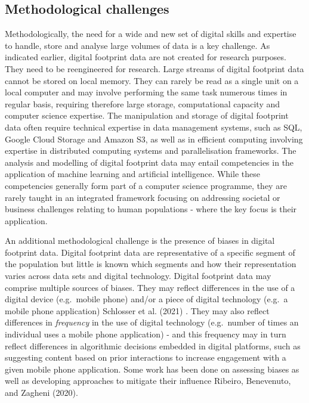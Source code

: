 \documentclass[
  letterpaper,
  DIV=11,
  numbers=noendperiod]{scrreprt}
\begin{document}
\hypertarget{methodological-challenges}{%
\subsection{Methodological challenges}\label{methodological-challenges}}

Methodologically, the need for a wide and new set of digital skills and
expertise to handle, store and analyse large volumes of data is a key
challenge. As indicated earlier, digital footprint data are not created
for research purposes. They need to be reengineered for research. Large
streams of digital footprint data cannot be stored on local memory. They
can rarely be read as a single unit on a local computer and may involve
performing the same task numerous times in regular basis, requiring
therefore large storage, computational capacity and computer science
expertise. The manipulation and storage of digital footprint data often
require technical expertise in data management systems, such as SQL,
Google Cloud Storage and Amazon S3, as well as in efficient computing
involving expertise in distributed computing systems and parallelisation
frameworks. The analysis and modelling of digital footprint data may
entail competencies in the application of machine learning and
artificial intelligence. While these competencies generally form part of
a computer science programme, they are rarely taught in an integrated
framework focusing on addressing societal or business challenges
relating to human populations - where the key focus is their
application.

An additional methodological challenge is the presence of biases in
digital footprint data. Digital footprint data are representative of a
specific segment of the population but little is known which segments
and how their representation varies across data sets and digital
technology. Digital footprint data may comprise multiple sources of
biases. They may reflect differences in the use of a digital device
(e.g.~mobile phone) and/or a piece of digital technology (e.g.~a mobile
phone application) Schlosser et al. (2021) . They may also reflect
differences in \emph{frequency} in the use of digital technology
(e.g.~number of times an individual uses a mobile phone application) -
and this frequency may in turn reflect differences in algorithmic
decisions embedded in digital platforms, such as suggesting content
based on prior interactions to increase engagement with a given mobile
phone application. Some work has been done on assessing biases as well
as developing approaches to mitigate their influence Ribeiro,
Benevenuto, and Zagheni (2020).
\end{document}
